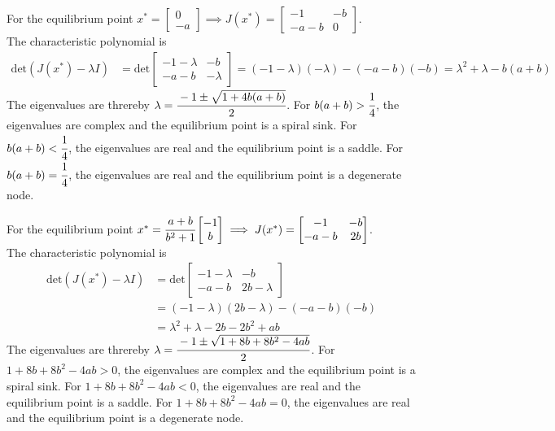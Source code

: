 For the equilibrium point \( x^* = \begin{bmatrix} 0 \\ -a \end{bmatrix} \implies J(x^*) = \begin{bmatrix} -1 & -b \\ -a - b & 0 \end{bmatrix} \).\\
The characteristic polynomial is
\begin{align*}
    \text{det} \left( J(x^*) - \lambda I \right)
     & =
    \text{det}
    \begin{bmatrix}
        -1 - \lambda & -b       \\
        -a - b       & -\lambda
    \end{bmatrix}
    =
    (-1 - \lambda)(-\lambda) - (-a - b)(-b)
    =
    \lambda^2 + \lambda - b(a + b)
\end{align*}
The eigenvalues are threreby \( \lambda = \cfrac{-1 \pm \sqrt{1 + 4b(a + b)}}{2} \).
For \( b(a + b) > \cfrac{1}{4} \), the eigenvalues are complex and the equilibrium point is a spiral sink.
For \( b(a + b) < \cfrac{1}{4} \), the eigenvalues are real and the equilibrium point is a saddle.
For \( b(a + b) = \cfrac{1}{4} \), the eigenvalues are real and the equilibrium point is a degenerate node.

For the equilibrium point \( x^* = \cfrac{a+b}{b^2 + 1} \begin{bmatrix} -1 \\ b \end{bmatrix} \implies J(x^*) = \begin{bmatrix} -1 & -b \\ -a - b & 2b \end{bmatrix} \).\\
The characteristic polynomial is
\begin{align*}
    \text{det} \left( J(x^*) - \lambda I \right)
     & =
    \text{det}
    \begin{bmatrix}
        -1 - \lambda & -b           \\
        -a - b       & 2b - \lambda
    \end{bmatrix}
    \\ & =
    (-1 - \lambda)(2b - \lambda) - (-a - b)(-b)
    \\ & =
    \lambda^2 + \lambda - 2b - 2b^2 + ab
\end{align*}
The eigenvalues are threreby \( \lambda = \cfrac{-1 \pm \sqrt{1 + 8b + 8b^2 - 4ab}}{2} \).
For \( 1 + 8b + 8b^2 - 4ab > 0 \), the eigenvalues are complex and the equilibrium point is a spiral sink.
For \( 1 + 8b + 8b^2 - 4ab < 0 \), the eigenvalues are real and the equilibrium point is a saddle.
For \( 1 + 8b + 8b^2 - 4ab = 0 \), the eigenvalues are real and the equilibrium point is a degenerate node.

